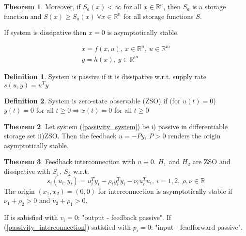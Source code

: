 \documentclass[10pt,landscape]{article}
\theoremstyle{definition}
\newtheorem{Theorem}{Theorem}[section]
\newtheorem*{Definition}{Definition}
\begin{document}
\begin{multicols}{4}
\begin{Theorem}
Moreover, if $S_a(x) < \infty$ for all $x \in \mathbb{R}^n$, then $S_a$ is a storage function and $S(x) \geq S_a(x) \ \forall x \in \mathbb{R}^n$ for all storage functions $S$.
\end{Theorem}

If system is dissipative then $x=0$ is asymptotically stable.

\begin{equation}\label{passivity_system}
\begin{split}
\dot{x} = f(x,u), \ x \in \mathbb{R}^n, \ u \in \mathbb{R}^m \\
y = h(x), \ y \in \mathbb{R}^m
\end{split}
\end{equation}

\begin{Definition}
System is passive if it is dissipative w.r.t. supply rate $s(u,y) = u^Ty$
\end{Definition}

\begin{Definition}
System is zero-state observable (ZSO) if (for $u(t)=0$) $y(t)=0$ for all $t \geq 0 \Rightarrow x(t) = 0$ for all $t \geq 0$
\end{Definition}

\begin{Theorem}
Let system (\ref{passivity_system}) be i) passive in differentiable storage set ii)ZSO. Then the feedback $u=-Py, \ P > 0$ renders the origin asymptotically stable.
\end{Theorem}

\begin{Theorem}
Feedback interconnection with $u \equiv 0$. $H_1$ and $H_2$ are ZSO and dissipative with $S_1, \ S_2$ w.r.t.
\begin{equation}\label{passivity_interconnection}
s_i(u_i,y_i) = u_i^Ty_i - \rho_iy_i^Ty_i - \nu_iu_i^Tu_i, \ i=1,2, \ \rho,\nu \in \mathbb{R}
\end{equation}
The origin $(x_1,x_2) = (0,0)$ for interconnection is asymptotically stable if $\nu_1 + \rho_2 > 0$ and $\nu_2 + \rho_1 > 0$.
\end{Theorem}

If is sabisfied with $v_i=0$: "output - feedback passive". If (\ref{passivity_interconnection}) satisfied with $p_i=0$: "input - feadforward passive".


\end{multicols}
\end{document}
